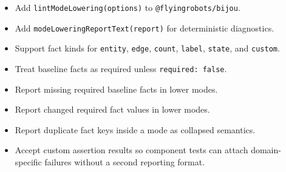 \begin{itemize}
\tightlist
\item
  Add \texttt{l\allowbreak{}i\allowbreak{}n\allowbreak{}t\allowbreak{}M\allowbreak{}o\allowbreak{}d\allowbreak{}e\allowbreak{}L\allowbreak{}o\allowbreak{}w\allowbreak{}e\allowbreak{}r\allowbreak{}i\allowbreak{}n\allowbreak{}g\allowbreak{}(\allowbreak{}o\allowbreak{}p\allowbreak{}t\allowbreak{}i\allowbreak{}o\allowbreak{}n\allowbreak{}s\allowbreak{})} to \texttt{@\allowbreak{}f\allowbreak{}l\allowbreak{}y\allowbreak{}i\allowbreak{}n\allowbreak{}g\allowbreak{}r\allowbreak{}o\allowbreak{}b\allowbreak{}o\allowbreak{}t\allowbreak{}s\allowbreak{}/\allowbreak{}b\allowbreak{}i\allowbreak{}j\allowbreak{}o\allowbreak{}u}.
\item
  Add \texttt{m\allowbreak{}o\allowbreak{}d\allowbreak{}e\allowbreak{}L\allowbreak{}o\allowbreak{}w\allowbreak{}e\allowbreak{}r\allowbreak{}i\allowbreak{}n\allowbreak{}g\allowbreak{}R\allowbreak{}e\allowbreak{}p\allowbreak{}o\allowbreak{}r\allowbreak{}t\allowbreak{}T\allowbreak{}e\allowbreak{}x\allowbreak{}t\allowbreak{}(\allowbreak{}r\allowbreak{}e\allowbreak{}p\allowbreak{}o\allowbreak{}r\allowbreak{}t\allowbreak{})} for deterministic diagnostics.
\item
  Support fact kinds for \texttt{e\allowbreak{}n\allowbreak{}t\allowbreak{}i\allowbreak{}t\allowbreak{}y}, \texttt{e\allowbreak{}d\allowbreak{}g\allowbreak{}e}, \texttt{c\allowbreak{}o\allowbreak{}u\allowbreak{}n\allowbreak{}t}, \texttt{l\allowbreak{}a\allowbreak{}b\allowbreak{}e\allowbreak{}l}, \texttt{s\allowbreak{}t\allowbreak{}a\allowbreak{}t\allowbreak{}e}, and \texttt{c\allowbreak{}u\allowbreak{}s\allowbreak{}t\allowbreak{}o\allowbreak{}m}.
\item
  Treat baseline facts as required unless \texttt{r\allowbreak{}e\allowbreak{}q\allowbreak{}u\allowbreak{}i\allowbreak{}r\allowbreak{}e\allowbreak{}d\allowbreak{}:\allowbreak{} \allowbreak{}f\allowbreak{}a\allowbreak{}l\allowbreak{}s\allowbreak{}e}.
\item
  Report missing required baseline facts in lower modes.
\item
  Report changed required fact values in lower modes.
\item
  Report duplicate fact keys inside a mode as collapsed semantics.
\item
  Accept custom assertion results so component tests can attach domain-specific failures without a second reporting format.
\end{itemize}

